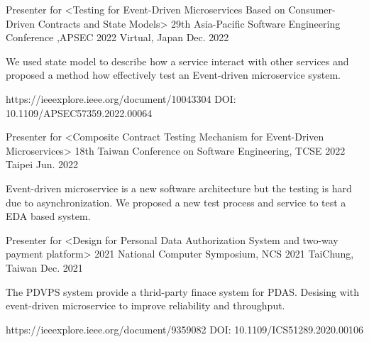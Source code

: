 

\begin{cventries}

  \cventry
    {Presenter for <Testing for Event-Driven Microservices Based on Consumer-Driven Contracts and State Models>} %
    {29th Asia-Pacific Software Engineering Conference ,APSEC 2022} %
    {Virtual, Japan} %
    {Dec. 2022} %
    {
      \begin{cvitems} %
        \item {We used state model to describe how a service interact with other services and proposed a method how effectively test an Event-driven microservice system.}
        \item {https://ieeexplore.ieee.org/document/10043304 DOI: 10.1109/APSEC57359.2022.00064}
      \end{cvitems}
    }

  \cventry
    {Presenter for <Composite Contract Testing Mechanism for Event-Driven Microservices>} %
    {18th Taiwan Conference on Software Engineering, TCSE 2022} %
    {Taipei} %
    {Jun. 2022} %
    {
      \begin{cvitems} %
        \item {Event-driven microservice is a new software architecture but the testing is hard due to asynchronization. We proposed a new test process and service to test a EDA based system.}
      \end{cvitems}
    }

  \cventry
    {Presenter for <Design for Personal Data Authorization System and two-way payment platform>} %
    {2021 National Computer Symposium, NCS 2021} %
    {TaiChung, Taiwan} %
    {Dec. 2021} %
    {
      \begin{cvitems} %
        \item {The PDVPS system provide a thrid-party finace system for PDAS. Desising with event-driven microservice to improve reliability and throughput.}
        \item {https://ieeexplore.ieee.org/document/9359082 DOI: 10.1109/ICS51289.2020.00106}
      \end{cvitems}
    }


\end{cventries}
